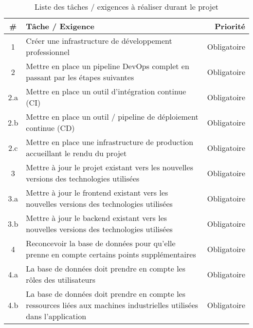 \documentclass[
    iai, %
    il, %
]{heig-tb}
\begin{document}
\begin{table}[h]
    \begin{center}
        \caption{Liste des tâches / exigences à réaliser durant le projet \label{taches}}
        \begin{tabular}{c|l|r}
            #   & Tâche / Exigence                                                                                                       & Priorité      \\ \hline
            1   & Créer une infrastructure de développement professionnel                                                                & Obligatoire   \\
            2   & Mettre en place un pipeline DevOps complet en passant par les étapes suivantes                                         & Obligatoire   \\
            2.a & Mettre en place un outil d’intégration continue (CI)                                                                   & Obligatoire   \\
            2.b & Mettre en place un outil / pipeline de déploiement continue (CD)                                                       & Obligatoire   \\
            2.c & Mettre en place une infrastructure de production accueillant le rendu du projet                                        & Obligatoire   \\
            3   & Mettre à jour le projet existant vers les nouvelles versions des technologies utilisées                                & Obligatoire   \\
            3.a & Mettre à jour le frontend existant vers les nouvelles versions des technologies utilisées                              & Obligatoire   \\
            3.b & Mettre à jour le backend existant vers les nouvelles versions des technologies utilisées                               & Obligatoire   \\
            4   & Reconcevoir la base de données pour qu’elle prenne en compte certains points supplémentaires                           & Obligatoire   \\
            4.a & La base de données doit prendre en compte les rôles des utilisateurs                                                   & Obligatoire   \\
            4.b & La base de données doit prendre en compte les ressources liées aux machines industrielles utilisées dans l’application & Obligatoire   \\

\end{tabular}
\end{center}
\end{table}
\end{document}
